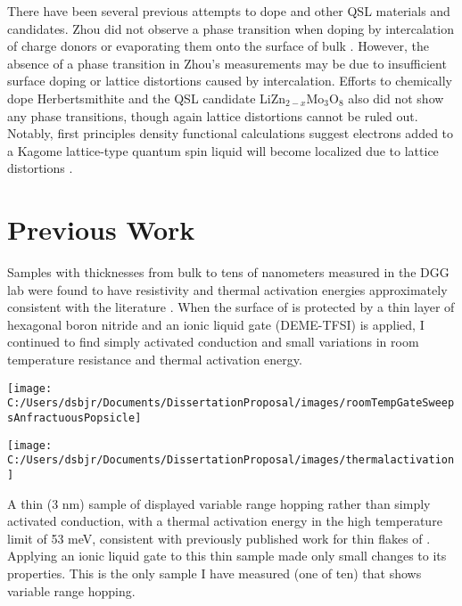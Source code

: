 \documentclass[11pt]{article}
\newenvironment{Figure}
  {\par\medskip\noindent\minipage{\linewidth}}
  {\endminipage\par\medskip}
\begin{document}
\begin{multicols}{2}
There have been several previous attempts to dope \rucl and other QSL materials and candidates. Zhou did not observe a phase transition when doping \rucl by intercalation of charge donors or evaporating them onto the surface of bulk \rucl \cite{Zhou2016}. However, the absence of a phase transition in Zhou's measurements may be due to insufficient surface doping or lattice distortions caused by intercalation. Efforts to chemically dope Herbertsmithite \cite{Kelly2016} and the QSL candidate LiZn$_{2-x}$Mo$_{3}$O$_{8}$ \cite{Sheckelton2015} also did not show any phase transitions, though again lattice distortions cannot be ruled out. Notably, first principles density functional calculations suggest electrons added to a Kagome lattice-type quantum spin liquid will become localized due to lattice distortions \cite{Liu2018}.

\section{Previous Work}

Samples with thicknesses from bulk to tens of nanometers measured in the DGG lab were found to have resistivity and thermal activation energies approximately consistent with the literature \cite{Rojas1983}. When the surface of \rucl is protected by a thin layer of hexagonal boron nitride and an ionic liquid gate (DEME-TFSI) is applied, I continued to find simply activated conduction and small variations in room temperature resistance and thermal activation energy.

\begin{Figure}
\centering
  {\texttt{[image: C:/Users/dsbjr/Documents/DissertationProposal/images/roomTempGateSweepsAnfractuousPopsicle]}\label{fig:f1}}
\end{Figure}

\begin{Figure}  
  {\texttt{[image: C:/Users/dsbjr/Documents/DissertationProposal/images/thermalactivation]}\label{fig:f2}}
\end{Figure}

A thin (3 nm) sample of \rucl displayed variable range hopping rather than simply activated conduction, with a thermal activation energy in the high temperature limit of 53 meV, consistent with previously published work for thin flakes of \rucl \cite{Mashhadi2018}. Applying an ionic liquid gate to this thin sample made only small changes to its properties. This is the only sample I have measured (one of ten) that shows variable range hopping.


\end{multicols}
\end{document}
